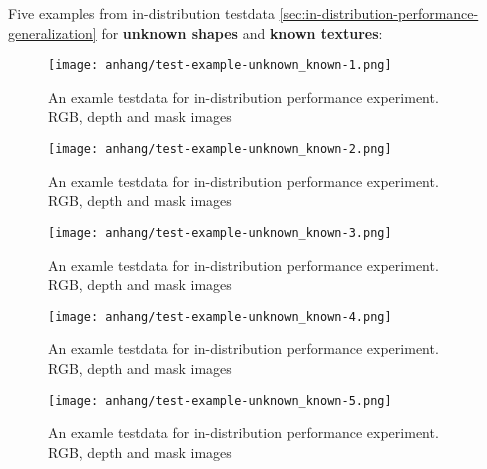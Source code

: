 	\FloatBarrier
	\clearpage
	Five examples from in-distribution testdata \ref{sec:in-distribution-performance-generalization} for \textbf{unknown shapes} and \textbf{known textures}:
	\begin{figure}[H]
		\centering
		\texttt{[image: anhang/test-example-unknown\_known-1.png]}
		\caption[An examle testdata for in-distribution performance experiment. RGB, depth and mask images]{An examle testdata for in-distribution performance experiment. RGB, depth and mask images}
	\end{figure}
	\begin{figure}[H]
		\centering
		\texttt{[image: anhang/test-example-unknown\_known-2.png]}
		\caption[An examle testdata for in-distribution performance experiment. RGB, depth and mask images]{An examle testdata for in-distribution performance experiment. RGB, depth and mask images}
	\end{figure}
	\begin{figure}[H]
		\centering
		\texttt{[image: anhang/test-example-unknown\_known-3.png]}
		\caption[An examle testdata for in-distribution performance experiment. RGB, depth and mask images]{An examle testdata for in-distribution performance experiment. RGB, depth and mask images}
	\end{figure}
	\begin{figure}[H]
		\centering
		\texttt{[image: anhang/test-example-unknown\_known-4.png]}
		\caption[An examle testdata for in-distribution performance experiment. RGB, depth and mask images]{An examle testdata for in-distribution performance experiment. RGB, depth and mask images}
	\end{figure}
	\begin{figure}[H]
		\centering
		\texttt{[image: anhang/test-example-unknown\_known-5.png]}
		\caption[An examle testdata for in-distribution performance experiment. RGB, depth and mask images]{An examle testdata for in-distribution performance experiment. RGB, depth and mask images}
	\end{figure}
	
	
	
